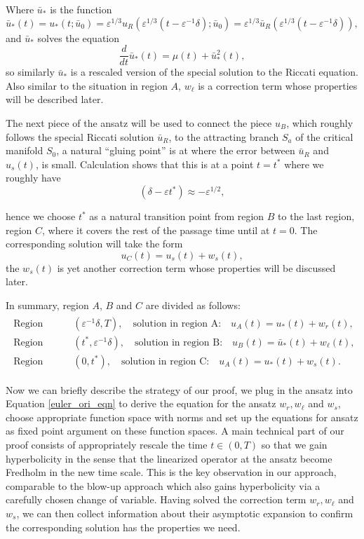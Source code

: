 \documentclass[letterpaper,11pt]{article}
\newcommand{\eps}{\varepsilon}
\numberwithin{equation}{section}
\theoremstyle{plain}
\begin{document}
Where $\bar{u}_*$ is the function
\begin{equation}\label{uldef}
\bar{u}_*(t) = u_*(t;\bar{u}_0) = \eps^{1/3} u_R( \eps^{1/3}(t-\eps^{-1}\delta); \bar{u}_0)=\eps^{1/3}\bar{u}_R(\eps^{1/3}(t-\eps^{-1}\delta)),
\end{equation}
and $\bar{u}_*$ solves the equation
\begin{equation}\label{uleq}
\frac{d}{dt}\bar{u}_* (t) = \mu(t) + \bar{u}_*^2(t),
\end{equation}
so similarly $\bar{u}_*$ is a rescaled version of the special solution to the Riccati equation. Also similar to the situation in region $A$, $w_\ell$ is a correction term whose properties will be described later.

The next piece of the ansatz will be used to connect the piece $u_B$, which roughly follows the special Riccati solution $\bar{u}_R$, to the attracting branch $S_a$ of the critical manifold $S_0$, a natural ``gluing point'' is at where the error between $\bar{u}_R$ and $u_s(t)$, is small. Calculation shows that this is at a point $t=t^*$ where we roughly have
\begin{equation}
(\delta - \eps t^*) \approx -\eps^{1/2},
\end{equation} 

hence we choose $t^*$ as a natural transition point from region $B$ to the last region, region $C$, where it covers the rest of the passage time until at $t=0$. The corresponding solution will take the form
\[
u_C(t) = u_s(t) + w_s(t),
\]
the $w_s(t)$ is yet another correction term whose properties will be discussed later. 

In summary, region $A$, $B$ and $C$ are divided as follows:
\begin{align}\label{region_division_t}
\begin{split}
\text{Region A:} & \quad (\eps^{-1}\delta, T), \quad \text{solution in region A:} \quad u_A(t) = u_*(t)+w_r(t), \\
\text{Region B:} & \quad (t^*, \eps^{-1}\delta), \quad \text{solution in region B:} \quad u_B(t) = \bar{u}_*(t)+w_\ell(t),  \\
\text{Region C:} & \quad (0, t^*), \quad \text{solution in region C:} \quad u_A(t) = u_*(t)+w_s(t).
\end{split}
\end{align}

Now we can briefly describe the strategy of our proof, we plug in the ansatz into Equation \eqref{euler_ori_eqn} to derive the equation for the ansatz $w_r, w_\ell $ and $w_s$, choose appropriate function space with norms and set up the equations for ansatz as fixed point argument on these function spaces. A main technical part of our proof consists of appropriately rescale the time $t \in (0,T)$ so that we gain hyperbolicity in the sense that the linearized operator at the ansatz become Fredholm in the new time scale. This is the key observation in our approach, comparable to the blow-up approach which also gains hyperbolicity via a carefully chosen change of variable. Having solved the correction term $w_r, w_\ell$ and $w_s$, we can then collect information about their asymptotic expansion to confirm the corresponding solution has the properties we need.
\end{document}
